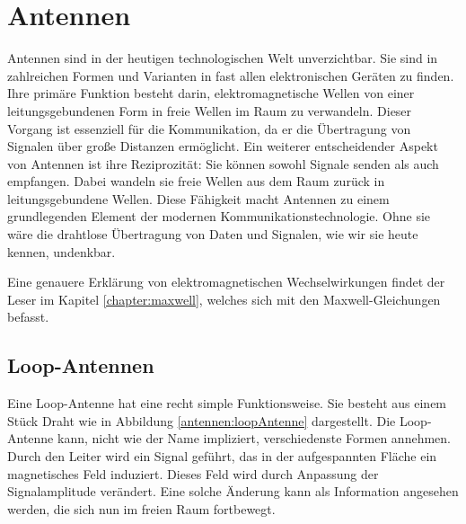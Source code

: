 %
%
% 
%
%

\section{Antennen\label{antennen:antennenAllgemein}}
Antennen sind in der heutigen technologischen Welt unverzichtbar.
Sie sind in zahlreichen Formen und Varianten in fast allen
elektronischen Geräten zu finden. Ihre primäre Funktion besteht
darin, elektromagnetische Wellen von einer leitungsgebundenen Form
%
%
in freie Wellen im Raum zu verwandeln. Dieser Vorgang ist essenziell
für die Kommunikation, da er die Übertragung von Signalen über große
Distanzen ermöglicht. Ein weiterer entscheidender Aspekt von Antennen
ist ihre Reziprozität: Sie können sowohl Signale senden als auch
%
empfangen. Dabei wandeln sie freie Wellen aus dem Raum zurück in
leitungsgebundene Wellen. Diese Fähigkeit macht Antennen zu einem
grundlegenden Element der modernen Kommunikationstechnologie. Ohne
sie wäre die drahtlose Übertragung von Daten und Signalen, wie wir
sie heute kennen, undenkbar.

Eine genauere Erklärung von elektromagnetischen Wechselwirkungen findet der Leser im Kapitel \ref{chapter:maxwell},
welches sich mit den Maxwell-Gleichungen befasst. 
%

\subsection{Loop-Antennen\label{antennen:antennenAllgemein_loop}}


Eine Loop-Antenne hat eine recht simple Funktionsweise. Sie besteht aus einem Stück Draht wie in Abbildung \ref{antennen:loopAntenne} dargestellt. Die Loop-Antenne kann, nicht wie der Name impliziert, verschiedenste Formen annehmen. Durch den Leiter wird ein Signal geführt, das in der aufgespannten Fläche ein magnetisches Feld induziert. Dieses Feld wird durch Anpassung der Signalamplitude verändert. Eine solche Änderung kann als Information angesehen werden, die sich nun im freien Raum fortbewegt.



